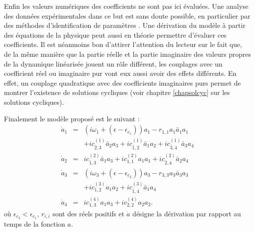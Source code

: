 \documentclass{book}
\begin{document}
Enfin les valeurs num\'eriques des coefficients ne sont pas ici
\'evalu\'ees. 
Une analyse des donn\'ees exp\'erimentales dans ce but est sans doute
possible, en particulier par des m\'ethodes d'identification de
param\`etres \cite{Ritz89}. 
Une d\'erivation du mod\`ele \`a partir des
\'equations de la physique peut aussi en th\'eorie 
permettre d'\'evaluer ces
coefficients. Il est n\'eanmoins bon d'attirer l'attention du lecteur
sur le fait que, de la m\^eme mani\`ere que la partie 
r\'eelle et la partie
imaginaire des valeurs propres de la dynamique lin\'earis\'ee jouent un
r\^ole diff\'erent, les couplages avec un coefficient r\'eel ou imaginaire
pur vont eux aussi avoir des effets diff\'erents.
En effet, un couplage quadratique avec des coefficients imaginaires
purs permet de montrer l'existence de solutions cycliques (voir
chapitre \ref{chapsolcyc} sur les solutions cycliques).

Finalement le mod\`ele propos\'e est le suivant :
\begin{eqnarray}
\dot{a}_1&=&(i\omega_1+(\epsilon-\epsilon_{c_1}))a_1-r_{1,1}a_1\bar{a}_1a_1\nonumber\\
&&+ic^{(1)}_{\bar{2},3}\bar{a}_2{a}_3+ic^{(1)}_{\bar{1},2}\bar{a}_1a_2+ic^{(1)}_{\bar{3},4}\bar{a}_3a_4\\
\dot{a}_2&=&ic^{(2)}_{\bar{1},3}\bar{a}_1{a}_3+ic^{(2)}_{1,1}a_1a_1+ic^{(2)}_{\bar{2},4}\bar{a}_2a_4\label{eqa2sys}\\
\dot{a}_3&=&(i\omega_3+(\epsilon-\epsilon_{c_3}))a_3-r_{3,3}a_3\bar{a}_3a_3\nonumber\\
&&+ic^{(3)}_{1,2}a_1a_2+ic^{(3)}_{\bar{1},4}\bar{a}_1a_4\\
\dot{a}_4&=&ic^{(4)}_{1,3}a_1a_3+ic^{(4)}_{2,2}a_2a_2.\label{eqa4sys}
\end{eqnarray}
o\`u $\epsilon_{c_3}<\epsilon_{c_1}$, $r_{i,i}$ sont des r\'eels
positifs et $\dot a$ d\'esigne la d\'erivation par rapport au
temps de la fonction $a$.
\end{document}
